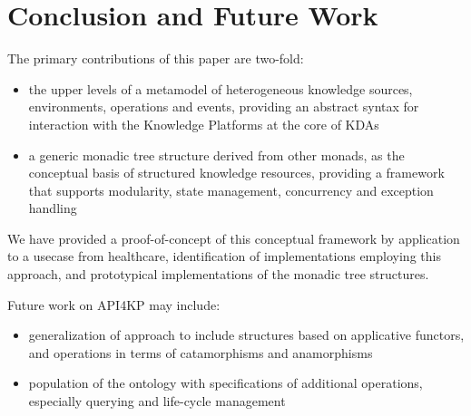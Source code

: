 \documentclass[runningheads]{llncs}
\begin{document}
\section{Conclusion and Future Work}
\label{sec:conc}
The primary contributions of this paper are two-fold:
\begin{itemize}
\item the upper levels of a metamodel of heterogeneous knowledge sources, environments, operations and events, providing an abstract syntax for interaction with the Knowledge Platforms at the core of KDAs
\item a generic monadic tree structure derived from other monads, as the conceptual basis of structured knowledge resources, providing a framework that supports modularity, state management, concurrency and exception handling
\end{itemize}
We have provided a proof-of-concept of this conceptual framework by application to a usecase from healthcare, identification of implementations employing this approach, and prototypical implementations of the monadic tree structures.

Future work on API4KP may include:
\begin{itemize}
\item generalization of approach to include structures based on applicative functors, and
operations in terms of catamorphisms and anamorphisms
\item population of the ontology with specifications of additional operations, especially querying and life-cycle management
\end{itemize}


%
%




\end{document}
